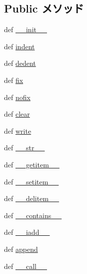 \subsection*{Public メソッド}
\begin{DoxyCompactItemize}
\item 
def \hyperlink{classm5_1_1util_1_1code__formatter_1_1code__formatter_ac775ee34451fdfa742b318538164070e}{\_\-\_\-init\_\-\_\-}
\item 
def \hyperlink{classm5_1_1util_1_1code__formatter_1_1code__formatter_a06fdea5005bd6d0c00b1b12679fbb258}{indent}
\item 
def \hyperlink{classm5_1_1util_1_1code__formatter_1_1code__formatter_a5c9a0f0b372ff8e28fc0580b9ef5b4b3}{dedent}
\item 
def \hyperlink{classm5_1_1util_1_1code__formatter_1_1code__formatter_ae0b8c8dd3742689d128460a7bb0926bf}{fix}
\item 
def \hyperlink{classm5_1_1util_1_1code__formatter_1_1code__formatter_a3fd79eb94d7f3fd257c0ce5593dbf1e1}{nofix}
\item 
def \hyperlink{classm5_1_1util_1_1code__formatter_1_1code__formatter_a07b95aa63e9e2d286ef0aa83d5bb34b2}{clear}
\item 
def \hyperlink{classm5_1_1util_1_1code__formatter_1_1code__formatter_a8c7fc40f1124fcf3f5ee7116cd62f413}{write}
\item 
def \hyperlink{classm5_1_1util_1_1code__formatter_1_1code__formatter_aa7a4b9bc0941308e362738503137460e}{\_\-\_\-str\_\-\_\-}
\item 
def \hyperlink{classm5_1_1util_1_1code__formatter_1_1code__formatter_a50d766f4276c3d8fe330ac8cd344a75f}{\_\-\_\-getitem\_\-\_\-}
\item 
def \hyperlink{classm5_1_1util_1_1code__formatter_1_1code__formatter_a09195b01147e970ca71c48b57f653940}{\_\-\_\-setitem\_\-\_\-}
\item 
def \hyperlink{classm5_1_1util_1_1code__formatter_1_1code__formatter_a5fa6cfe34d7e2fe5b9c38e1d74fffac8}{\_\-\_\-delitem\_\-\_\-}
\item 
def \hyperlink{classm5_1_1util_1_1code__formatter_1_1code__formatter_a31ecdf34e79a47aea99a17eea32b7ac2}{\_\-\_\-contains\_\-\_\-}
\item 
def \hyperlink{classm5_1_1util_1_1code__formatter_1_1code__formatter_a2164b6b3eb98c2c9b8aab87e8d29dd51}{\_\-\_\-iadd\_\-\_\-}
\item 
def \hyperlink{classm5_1_1util_1_1code__formatter_1_1code__formatter_a69e6c03a1e37f0277f464db19e5fd985}{append}
\item 
def \hyperlink{classm5_1_1util_1_1code__formatter_1_1code__formatter_ae844e0019d38360a86bac1474132db3c}{\_\-\_\-call\_\-\_\-}
\end{DoxyCompactItemize}
